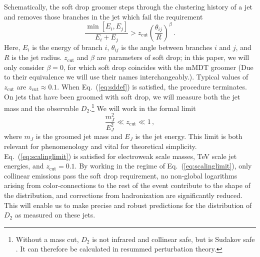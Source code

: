 \documentclass[a4paper,11pt]{article}
\def\zcut{z_{\text{cut}}}
\DeclareRobustCommand{\Eq}[1]{Eq.~(\ref{#1})}
\begin{document}
Schematically, the soft drop groomer steps through the clustering history of a jet and removes those branches in the jet which fail the requirement
\begin{equation}\label{eq:sddef}
\frac{\min[E_i,E_j]}{E_i+E_j}> \zcut \left(\frac{\theta_{ij}}{R}\right)^\beta\,.
\end{equation}
Here, $E_i$ is the energy of branch $i$, $\theta_{ij}$ is the angle between branches $i$ and $j$, and $R$ is the jet radius.  $\zcut$ and $\beta$ are parameters of soft drop; in this paper, we will only consider $\beta = 0$, for which soft drop coincides with the mMDT groomer (Due to their equivalence we will use their names interchangeably.). Typical values of $\zcut$ are $\zcut\approx 0.1$. When \Eq{eq:sddef} is satisfied, the procedure terminates.  On jets that have been groomed with soft drop, we will measure both the jet mass and the observable $D_2$.\footnote{Without a mass cut, $D_2$ is not infrared and collinear safe, but is Sudakov safe \cite{Larkoski:2013paa,Larkoski:2015lea}. It can therefore be calculated in resummed perturbation theory.}  We will work in the formal limit
\begin{equation}\label{eq:scalinglimit}
\frac{m_J^2}{E_J^2} \ll \zcut \ll 1\,,
\end{equation}  
where $m_J$ is the groomed jet mass and $E_J$ is the jet energy.  This limit is both relevant for phenomenology and vital for theoretical simplicity.  \Eq{eq:scalinglimit} is satisfied for electroweak scale masses, TeV scale jet energies, and $\zcut = 0.1$.  By working in the regime of \Eq{eq:scalinglimit}, only collinear emissions pass the soft drop requirement, no non-global logarithms arising from color-connections to the rest of the event \cite{Dasgupta:2001sh} contribute to the shape of the distribution, and corrections from hadronization are significantly reduced.  This will enable us to make precise and robust predictions for the distribution of $D_2$ as measured on these jets.
\end{document}
